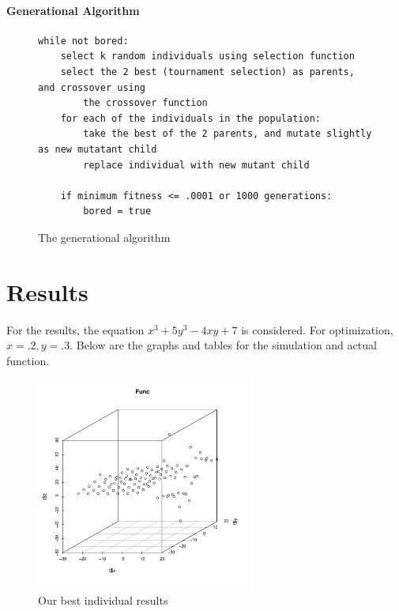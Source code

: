 \documentclass[12pt]{article}
\begin{document}
\subsection{Generational Algorithm}
\label{sec:gen_alg}
\begin{figure}[!h]
        \begin{center}
		\scriptsize
		\begin{lstlisting}
while not bored:
	select k random individuals using selection function
	select the 2 best (tournament selection) as parents, and crossover using
		the crossover function
	for each of the individuals in the population:
		take the best of the 2 parents, and mutate slightly as new mutatant child
		replace individual with new mutant child

	if minimum fitness <= .0001 or 1000 generations:
		bored = true
		\end{lstlisting}
		\normalsize
               \caption{The generational algorithm}
                \label{gen_alg}
        \end{center}
\end{figure}


\pagebreak


\part{Results}
For the results, the equation $x^3 + 5y^3 - 4xy + 7$ is considered. For optimization, $ x = .2, y = .3$.  Below are the graphs and tables for the simulation and actual function.

\begin{figure}[!h]
        \begin{center}
		\includegraphics[width=70mm]{results.pdf}
               \caption{Our best individual results}
                \label{results}
        \end{center}
\end{figure}
\end{document}
